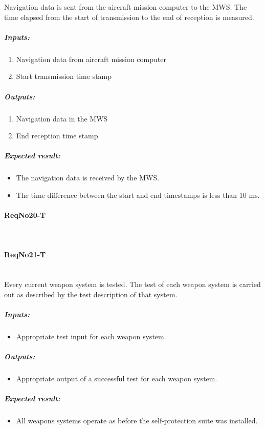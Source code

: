 Navigation data is sent from the aircraft mission computer to the MWS. The time elapsed from the start of transmission to the end of reception is measured.
\subparagraph{Inputs:}
	\begin{enumerate}
	\item Navigation data from aircraft mission computer
	\item Start transmission time stamp
	\end{enumerate}
\subparagraph{Outputs:}
	\begin{enumerate}
	\item Navigation data in the MWS
	\item End reception time stamp
	\end{enumerate}
\subparagraph{Expected result:}
	\begin{itemize}
	\item The navigation data is received by the MWS.
	\item The time difference between the start and end timestamps is less than 10 ms. 
	\end{itemize}

\paragraph{ReqNo20-T}\mbox{}\\ %

\paragraph{ReqNo21-T}\mbox{}\\ %
Every current weapon system is tested. The test of each weapon system is carried out as described by the test description of that system.

	\subparagraph{Inputs:}
	\begin{itemize}
	\item Appropriate test input for each weapon system.
	\end{itemize}
	\subparagraph{Outputs:}
	\begin{itemize}
	\item Appropriate output of a successful test for each weapon system.
	\end{itemize}
	\subparagraph{Expected result:}
	\begin{itemize}
	\item All weapons systems operate as before the self-protection suite was installed.
	\end{itemize}

